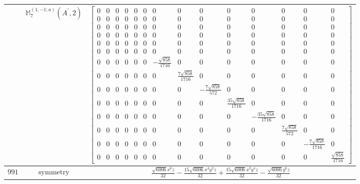 \documentclass[fleqn,8pt,landscape]{jsarticle}
\begin{document}
\begin{longtable}{ccc}
$  $ & $ \mathbb{M}_{7}^{(1,-1;a)}(A^{\prime},2) $ & $ \begin{bmatrix} 0 & 0 & 0 & 0 & 0 & 0 & 0 & 0 & 0 & 0 & 0 & 0 & 0 & 0 \\ 0 & 0 & 0 & 0 & 0 & 0 & 0 & 0 & 0 & 0 & 0 & 0 & 0 & 0 \\ 0 & 0 & 0 & 0 & 0 & 0 & 0 & 0 & 0 & 0 & 0 & 0 & 0 & 0 \\ 0 & 0 & 0 & 0 & 0 & 0 & 0 & 0 & 0 & 0 & 0 & 0 & 0 & 0 \\ 0 & 0 & 0 & 0 & 0 & 0 & 0 & 0 & 0 & 0 & 0 & 0 & 0 & 0 \\ 0 & 0 & 0 & 0 & 0 & 0 & 0 & 0 & 0 & 0 & 0 & 0 & 0 & 0 \\ 0 & 0 & 0 & 0 & 0 & 0 & - \frac{\sqrt{858}}{1716} & 0 & 0 & 0 & 0 & 0 & 0 & 0 \\ 0 & 0 & 0 & 0 & 0 & 0 & 0 & \frac{7 \sqrt{858}}{1716} & 0 & 0 & 0 & 0 & 0 & 0 \\ 0 & 0 & 0 & 0 & 0 & 0 & 0 & 0 & - \frac{7 \sqrt{858}}{572} & 0 & 0 & 0 & 0 & 0 \\ 0 & 0 & 0 & 0 & 0 & 0 & 0 & 0 & 0 & \frac{35 \sqrt{858}}{1716} & 0 & 0 & 0 & 0 \\ 0 & 0 & 0 & 0 & 0 & 0 & 0 & 0 & 0 & 0 & - \frac{35 \sqrt{858}}{1716} & 0 & 0 & 0 \\ 0 & 0 & 0 & 0 & 0 & 0 & 0 & 0 & 0 & 0 & 0 & \frac{7 \sqrt{858}}{572} & 0 & 0 \\ 0 & 0 & 0 & 0 & 0 & 0 & 0 & 0 & 0 & 0 & 0 & 0 & - \frac{7 \sqrt{858}}{1716} & 0 \\ 0 & 0 & 0 & 0 & 0 & 0 & 0 & 0 & 0 & 0 & 0 & 0 & 0 & \frac{\sqrt{858}}{1716} \end{bmatrix} $ \\ \hline
$ 991 $ & $ \text{symmetry} $ & $ \frac{\sqrt{6006} x^{6} z}{32} - \frac{15 \sqrt{6006} x^{4} y^{2} z}{32} + \frac{15 \sqrt{6006} x^{2} y^{4} z}{32} - \frac{\sqrt{6006} y^{6} z}{32} $ \\

\end{longtable}
\end{document}
